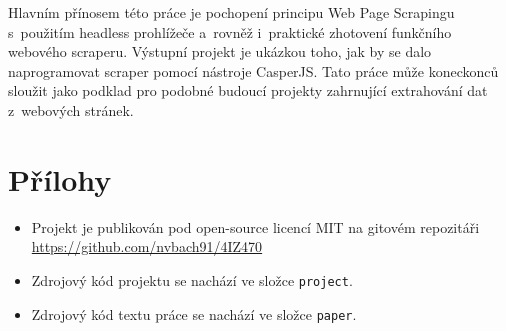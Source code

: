 \documentclass[11pt,a4paper]{article}
\begin{document}
Hlavním přínosem této práce je pochopení principu Web Page Scrapingu s~použitím headless prohlížeče a~rovněž i~praktické zhotovení funkčního webového scraperu. Výstupní projekt je ukázkou toho, jak by se dalo naprogramovat scraper pomocí nástroje CasperJS. Tato práce může koneckonců sloužit jako podklad pro podobné budoucí projekty zahrnující extrahování dat z~webových stránek.

\newpage






\section*{Přílohy}
\begin{itemize}
\item Projekt je publikován pod open-source licencí MIT na gitovém repozitáři \\ \url{https://github.com/nvbach91/4IZ470} 
\item Zdrojový kód projektu se nachází ve složce \texttt{project}.
\item Zdrojový kód textu práce se nachází ve složce \texttt{paper}.
\end{itemize}
\end{document}
